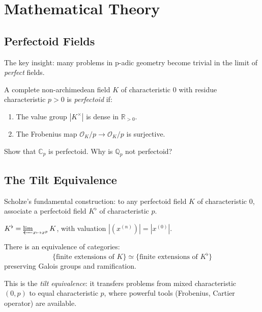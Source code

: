 \section{Mathematical Theory}

\subsection{Perfectoid Fields}
The key insight: many problems in p-adic geometry become trivial in the limit of \emph{perfect} fields.

\begin{definition}
A complete non-archimedean field $K$ of characteristic $0$ with residue characteristic $p>0$ is \emph{perfectoid} if:
\begin{enumerate}
\item The value group $|K^\times|$ is dense in $\mathbb{R}_{>0}$.
\item The Frobenius map $\mathcal{O}_K/p \to \mathcal{O}_K/p$ is surjective.
\end{enumerate}
\end{definition}

\begin{exercise}[Basic]
Show that $\mathbb{C}_p$ is perfectoid. Why is $\mathbb{Q}_p$ not perfectoid?
\end{exercise}

\subsection{The Tilt Equivalence}
Scholze's fundamental construction: to any perfectoid field $K$ of characteristic $0$, associate a perfectoid field $K^\flat$ of characteristic $p$.

\begin{definition}[Tilt]
$K^\flat = \varprojlim_{x \mapsto x^p} K$, with valuation $|(x^{(n)})| = |x^{(0)}|$.
\end{definition}

\begin{theorem}
There is an equivalence of categories:
\[
\{\text{finite extensions of } K\} \simeq \{\text{finite extensions of } K^\flat\}
\]
preserving Galois groups and ramification.
\end{theorem}

This is the \emph{tilt equivalence}: it transfers problems from mixed characteristic $(0,p)$ to equal characteristic $p$, where powerful tools (Frobenius, Cartier operator) are available.

